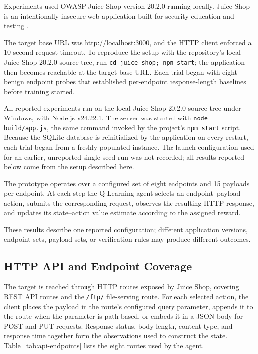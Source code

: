 \documentclass[conference, a4paper]{IEEEtran}
\begin{document}
Experiments used OWASP Juice Shop version 20.2.0 running locally.
Juice Shop is an intentionally insecure web application built for
security education and testing \cite{juiceshop}.

The target base URL was \url{http://localhost:3000}, and the HTTP
client enforced a 10-second request timeout. To reproduce the
setup with the repository's local Juice Shop 20.2.0 source tree,
run \texttt{cd juice-shop; npm start}; the application then becomes
reachable at the target base URL. Each trial began with eight
benign endpoint probes that established per-endpoint
response-length baselines before training started.

All reported experiments ran on the local Juice Shop 20.2.0 source
tree under Windows, with Node.js v24.22.1. The server was started
with \texttt{node build/app.js}, the same command invoked by the
project's \texttt{npm start} script. Because the SQLite database is
reinitialized by the application on every restart, each trial began
from a freshly populated instance. The launch configuration used
for an earlier, unreported single-seed run was not recorded; all
results reported below come from the setup described here.

The prototype operates over a configured set of eight endpoints and
15 payloads per endpoint. At each step the Q-Learning agent selects
an endpoint--payload action, submits the corresponding request,
observes the resulting HTTP response, and updates its
state--action value estimate according to the assigned reward.

These results describe one reported configuration; different
application versions, endpoint sets, payload sets, or verification
rules may produce different outcomes.

\subsection{HTTP API and Endpoint Coverage}

The target is reached through HTTP routes exposed by Juice Shop,
covering REST API routes and the \texttt{/ftp/} file-serving route.
For each selected action, the client places the payload in the
route's configured query parameter, appends it to the route when
the parameter is path-based, or embeds it in a JSON body for POST
and PUT requests. Response status, body length, content type, and
response time together form the observations used to construct the
state. Table~\ref{tab:api-endpoints} lists the eight routes used by
the agent.
\end{document}
